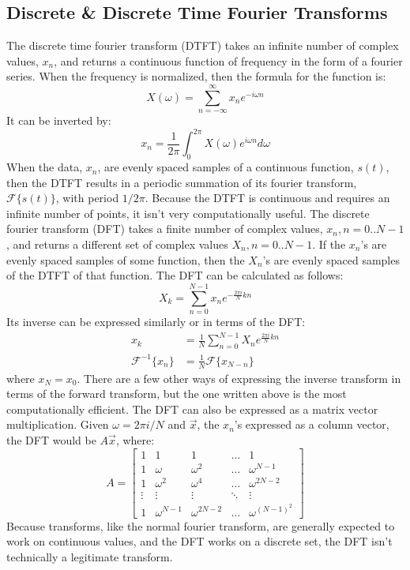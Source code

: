 \subsection{Discrete \& Discrete Time Fourier Transforms}
	The discrete time fourier transform (DTFT) takes an infinite number of complex values, $x_n$, and returns a continuous function of frequency in the form of a fourier series. When the frequency is normalized, then the formula for the function is:
	\[X(\omega)=\sum_{n=-\infty}^\infty x_n e^{-i\omega n}\]
	It can be inverted by:
	\[x_n=\frac{1}{2\pi}\int_0^{2\pi}X(\omega)e^{i\omega n}d\omega\]
	When the data, $x_n$, are evenly spaced samples of a continuous function, $s(t)$, then the DTFT results in a periodic summation of its fourier transform, $\mathcal{F}\{s(t)\}$, with period $1/{2\pi}$. Because the DTFT is continuous and requires an infinite number of points, it isn't very computationally useful. The discrete fourier transform (DFT) takes a finite number of complex values, $x_n, n=0..N-1$, and returns a different set of complex values $X_n, n=0..N-1$. If the $x_n$'s are evenly spaced samples of some function, then the $X_n$'s are evenly spaced samples of the DTFT of that function. The DFT can be calculated as follows:
	\[X_k=\sum_{n=0}^{N-1}x_n e^{-\frac{2\pi i}{N}kn}\]
	Its inverse can be expressed similarly or in terms of the DFT:
	\begin{align*}
		x_k&=\frac{1}{N}\sum_{n=0}^{N-1}X_n e^{\frac{2\pi i}{N}kn} \\
		\mathcal{F}^{-1}\{x_n\}&=\frac{1}{N}\mathcal{F}\{x_{N-n}\}
	\end{align*}
	where $x_N=x_0$. There are a few other ways of expressing the inverse transform in terms of the forward transform, but the one written above is the most computationally efficient. The DFT can also be expressed as a matrix vector multiplication. Given $\omega=2\pi i /N$ and $\vec{x}$, the $x_n$'s expressed as a column vector, the DFT would be $A\vec{x}$, where:
	\[A=
	\begin{bmatrix}
		1      & 1            & 1             & \dots  & 1                \\
		1      & \omega       & \omega^2      & \dots  & \omega^{N-1}     \\
		1      & \omega^2     & \omega^4      & \dots  & \omega^{2N-2}    \\
		\vdots & \vdots       & \vdots        & \ddots & \vdots           \\
		1      & \omega^{N-1} & \omega^{2N-2} & \dots  & \omega^{(N-1)^2}
		\end{bmatrix}\]
	Because transforms, like the normal fourier transform, are generally expected to work on continuous values, and the DFT works on a discrete set, the DFT isn't technically a legitimate transform.
